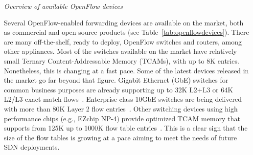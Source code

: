 %
%

\vspace{2mm}
\noindent \textit{Overview of available OpenFlow devices}

Several OpenFlow-enabled forwarding devices are available on 
the market, both as commercial and open source products (see Table~\ref{tab:openflowdevices}).
There are many off-the-shelf, ready to deploy, OpenFlow switches and routers, among other appliances.
Most of the switches available on the market have relatively small Ternary Content-Addressable Memory (TCAMs), with up to 8K entries. 
Nonetheless, this is changing at a fast pace. Some of the latest devices released in the market go 
far beyond that figure. Gigabit Ethernet (GbE) switches for common business purposes are already supporting up 
to 32K L2+L3 or 64K L2/L3 exact match flows~\cite{centecnetworks2013-1}. Enterprise class 10GbE switches 
are being delivered with more than 80K Layer 2 flow entries~\cite{nec2013-1}. Other switching 
devices using high performance chips (e.g., EZchip NP-4) provide optimized TCAM memory that 
 supports from 125K up to 1000K flow table entries~\cite{noviflow2013-1}. This is a clear sign that the size 
of the flow tables is growing at a pace aiming to meet the needs of future SDN deployments.

